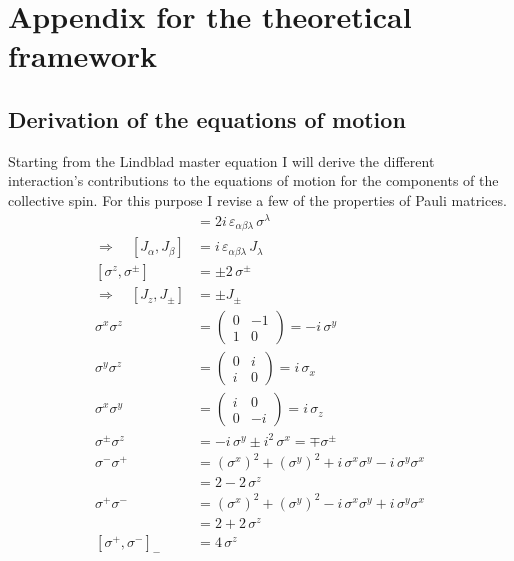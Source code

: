 \appendix
    \chapter{Appendix for the theoretical framework}
    \section{Derivation of the equations of motion}
    \label{appendix:eqm_derv}
    
    Starting from the Lindblad master equation I will derive the different interaction's contributions to the equations of motion for the components of the collective spin. For this purpose I
    revise a few of the properties of Pauli matrices.
    \begin{align*}
        [\sigma^\alpha,\sigma^\beta]&=2i\,\varepsilon_{\alpha\beta\lambda}\,\sigma^\lambda\\
        \Rightarrow\quad[J_\alpha,J_\beta]&=i\,\varepsilon_{\alpha\beta\lambda}\,J_\lambda\\
        [\sigma^z,\sigma^\pm]&=\pm2\,\sigma^\pm\\
        \Rightarrow\quad[J_z,J_\pm]&=\pm J_\pm\\
        \sigma^x\sigma^z&=\left( \begin{array}{cc}
             0 & -1  \\
             1& 0
        \end{array}\right)=-i\,\sigma^y\\
        \sigma^y\sigma^z&=\left( \begin{array}{cc}
             0 & i  \\
             i& 0
        \end{array}\right)=i\,\sigma_x\\
        \sigma^x\sigma^y&=\left( \begin{array}{cc}
             i & 0  \\
             0 & -i
        \end{array}\right)=i\,\sigma_z\\
        \sigma^\pm\sigma^z&=-i\,\sigma^y\pm i^2\,\sigma^x=\mp\sigma^\pm\\
        \sigma^-\sigma^+&=(\sigma^x)^2+(\sigma^y)^2+i\,\sigma^x\sigma^y-i\,\sigma^y\sigma^x\\
        &=2-2\,\sigma^z\\
        \sigma^+\sigma^-&=(\sigma^x)^2+(\sigma^y)^2-i\,\sigma^x\sigma^y+i\,\sigma^y\sigma^x\\
        &=2+2\,\sigma^z\\
        [\sigma^+,\sigma^-]_-&=4\,\sigma^z
    \end{align*}
